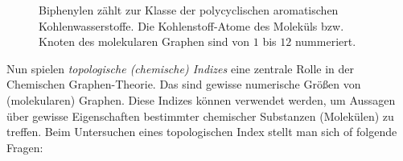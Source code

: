         \begin{figure}[h!]
            \centering
            \hspace*{1cm}
            \hspace{0mm}
            \caption[Lol]
            {
                Biphenylen zählt zur Klasse der polycyclischen aromatischen Kohlenwasserstoffe\protect\footnotemark.
                Die Kohlenstoff-Atome des Moleküls bzw. Knoten des molekularen Graphen sind von $1$ bis $12$ nummeriert.
            }
            \label{fig:Biphenylen}
        \end{figure}


        Nun spielen \textit{topologische (chemische) Indizes} eine zentrale Rolle in der Chemischen Graphen-Theorie.
        Das sind gewisse numerische Größen von (molekularen) Graphen.
        Diese Indizes können verwendet werden, um Aussagen über gewisse Eigenschaften bestimmter chemischer Substanzen (Molekülen) zu treffen.
        Beim Untersuchen eines topologischen Index stellt man sich of folgende Fragen:

